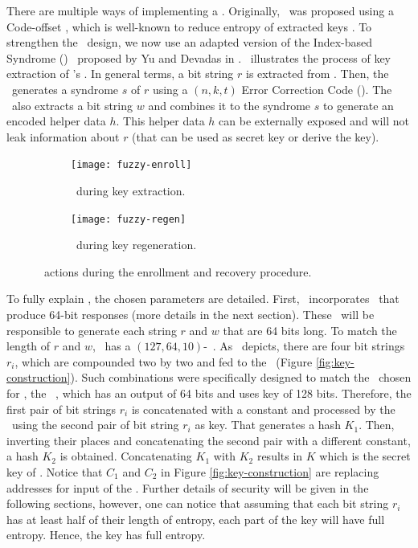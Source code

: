 There are multiple ways of implementing a \fuzzy. Originally, \cshia~was proposed using a Code-offset \fe, which is well-known to reduce entropy of extracted keys \cite{Armknecht2011:Formalization}. To strengthen the \cshia~design, we now use an adapted version of the Index-based Syndrome (\ibs) \fe~proposed by Yu and Devadas in \cite{Yu2010:RobustErrorCorrection}. \fenroll~illustrates the process of key extraction of \cshia's \fe. In general terms, a bit string $r$ is extracted from \pufs. Then, the \fe~generates a syndrome $s$ of $r$ using a $(n,k,t)$ Error Correction Code (\ecc). The \fe~also extracts a bit string $w$ and combines it to the syndrome $s$ to generate an encoded helper data $h$. This helper data $h$ can be externally exposed and will not leak information about $r$ (that can be used as secret key or derive the key).


\begin{figure}
     \centering
     \begin{subfigure}[b]{0.5\textwidth}
         \centering
         \texttt{[image: fuzzy-enroll]}
         \caption{\fuzzy~during key extraction.}
         \label{fig:fuzzy-enroll}
     \end{subfigure}
     \hfill
     \begin{subfigure}[b]{0.5\textwidth}
         \centering
         \texttt{[image: fuzzy-regen]}
         \caption{\fuzzy~during key regeneration.}
         \label{fig:fuzzy-regen}
     \end{subfigure}

        \caption{\fuzzy~actions during the enrollment and recovery procedure.}
        \label{fig:fuzzy-extractor}
\end{figure}

To fully explain \fenroll, the chosen parameters are detailed. First, \cshia~incorporates \pufs~that produce 64-bit responses (more details in the next section). These \pufs~will be responsible to generate each string $r$ and $w$ that are 64 bits long. To match the length of $r$ and $w$, \cshia~has a $(127, 64, 10)$-\bch~\ecc. As \fenroll~depicts, there are four bit strings $r_i$, which are compounded two by two and fed to the \prf~(Figure \ref{fig:key-construction}). Such combinations were specifically designed to match the \prf~chosen for \cshia, the \siphash~\cite{Aumasson2012:SipHash}, which has an output of 64 bits and uses key of 128 bits. Therefore, the first pair of bit strings $r_i$ is concatenated with a constant and processed by the \prf~using the second pair of bit string $r_i$ as key. That generates a hash $K_1$. Then, inverting their places and concatenating the second pair with a different constant, a hash $K_2$ is obtained. Concatenating $K_1$ with $K_2$ results in $K$ which is the secret key of \cshia. Notice that $C_1$ and $C_2$ in Figure \ref{fig:key-construction} are replacing addresses for input of the \ptaggen. Further details of security will be given in the following sections, however, one can notice that assuming that each bit string $r_i$ has at least half of their length of entropy, each part of the key will have full entropy. Hence, the key has full entropy. 

